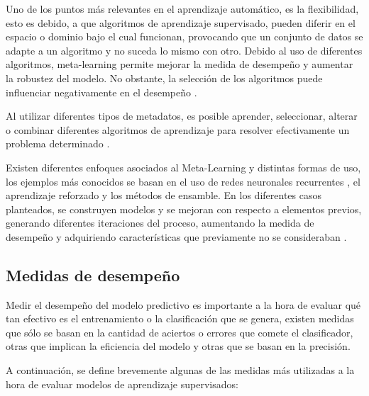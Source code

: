 Uno de los puntos más relevantes en el aprendizaje automático, es la flexibilidad, esto es debido, a que algoritmos de aprendizaje supervisado, pueden diferir en el espacio o dominio bajo el cual funcionan, provocando que un conjunto de datos se adapte a un algoritmo y no suceda lo mismo con otro. Debido al uso de diferentes algoritmos, meta-learning permite mejorar la medida de desempeño y aumentar la robustez del modelo. No obstante, la selección de los algoritmos puede influenciar negativamente en el desempeño \cite{hochreiter2001learning}.

Al utilizar diferentes tipos de metadatos, es posible aprender, seleccionar, alterar o combinar diferentes algoritmos de aprendizaje para resolver efectivamente un problema determinado \cite{schmidhuber1987evolutionary}. 

Existen diferentes enfoques asociados al Meta-Learning y distintas formas de uso, los ejemplos más conocidos se basan en el uso de redes neuronales recurrentes \cite{andrychowicz2016learning}, el aprendizaje reforzado \cite{schmidhuber1995learning} y los métodos de ensamble. En los diferentes casos planteados, se construyen modelos y se mejoran con respecto a elementos previos, generando diferentes iteraciones del proceso, aumentando la medida de desempeño y adquiriendo características que previamente no se consideraban \cite{finn2017model}.

\subsection{Medidas de desempeño \label{desempeno}}

Medir el desempeño del modelo predictivo es importante a la hora de evaluar qué tan efectivo es el entrenamiento o la clasificación que se genera, existen medidas que sólo se basan en la cantidad de aciertos o errores que comete el clasificador, otras que implican la eficiencia del modelo y otras que se basan en la precisión.

A continuación, se define brevemente algunas de las medidas más utilizadas a la hora de evaluar modelos de aprendizaje supervisados:

